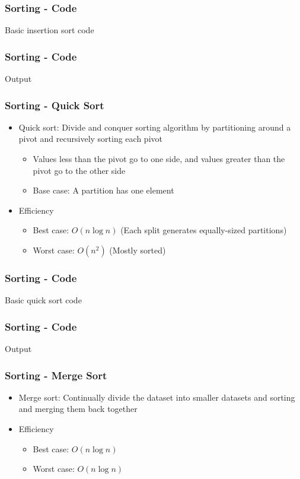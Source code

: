 \begin{frame}\frametitle{Sorting - Code}
Basic insertion sort code

\end{frame}

\begin{frame}\frametitle{Sorting - Code}
Output

\end{frame}

\begin{frame}\frametitle{Sorting - Quick Sort}
\begin{itemize}
\item Quick sort: Divide and conquer sorting algorithm by partitioning around a pivot and recursively sorting each pivot
	\begin{itemize}
	\item Values less than the pivot go to one side, and values greater than the pivot go to the other side
	\item Base case: A partition has one element
	\end{itemize}
\item Efficiency
	\begin{itemize}
	\item Best case: $O(n\log n)$ (Each split generates equally-sized partitions)
	\item Worst case: $O(n^2)$ (Mostly sorted)
	\end{itemize}
\end{itemize}
\end{frame}

\begin{frame}\frametitle{Sorting - Code}
Basic quick sort code

\end{frame}

\begin{frame}\frametitle{Sorting - Code}
Output

\end{frame}

\begin{frame}\frametitle{Sorting - Merge Sort}
\begin{itemize}
\item Merge sort: Continually divide the dataset into smaller datasets and sorting and merging them back together
\item Efficiency
	\begin{itemize}
	\item Best case: $O(n \log n)$
	\item Worst case: $O(n \log n)$
	\end{itemize}
\end{itemize}
\end{frame}

